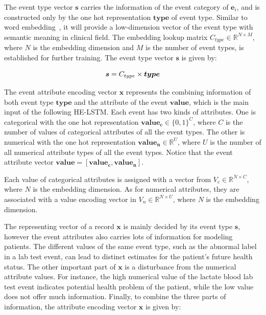 \documentclass[letterpaper]{article} %
\begin{document}
The event type vector $\bm s$ carries the information of the event category of $\bm e_i$, and is constructed only by the one hot representation $\bm{type}$ of event type. Similar to word embedding~\cite{mikolov2013distributed}, it will provide a low-dimension vector of the event type with semantic meaning in clinical field. The embedding lookup matrix $C_{type} \in \mathbb{R}^{N \times M}$,  where $N$ is the embedding dimension and $M$ is the number of event types, is established for further training. The event type vector $\bm s$ is given by:

\begin{equation}
\setlength{\abovedisplayskip}{3pt}
\bm s = C_{type} \times \bm{type}
\setlength{\belowdisplayskip}{3pt}
\end{equation}

The event attribute encoding vector $\bm x$ represents the combining information of both event type $\bm{type}$ and the attribute of the event $\bm{value}$, which is the main input of the following HE-LSTM.
Each event has two kinds of attributes. One is categorical with the one hot representation $\bm{value_c} \in \{0,1\}^{C}$, where $C$ is the number of values of categorical attributes of all the event types. The other is numerical with the one hot representation $\bm{value_n}\in \mathbb{R}^{U}$, where $U$ is the number of all numerical attribute  types of all the event types. Notice that the event attribute vector $\bm{value} =  \left[ \bm{value_c},\bm{value_n} \right]$.

Each value of categorical attributes is assigned with a vector from $V_c \in \mathbb{R}^{N \times C}$, where $N$ is the embedding dimension.
As for numerical attributes, they are associated with a value encoding vector in
$V_n \in \mathbb{R}^{N \times U}$, where $N$ is the embedding dimension.

The representing vector of a record $\bm x$ is mainly decided by its event type $\bm s$, however the event attributes  also carries lots of information for modeling patients.
The different values of the same event type, such as the abnormal label in a lab test event, can lead to distinct estimates for the patient's future health status. The other important part of $\bm x$ is a disturbance from the numerical attribute values. For instance, the high numerical value of the lactate blood lab test event indicates potential health problem of the patient, while the low value does not offer much information.
Finally, to combine the three parts of information, the attribute encoding vector  $\bm x$ is given by:
\end{document}
